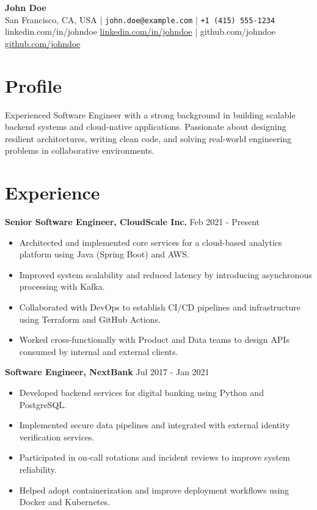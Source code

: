 \documentclass[11pt,a4paper]{article}
\begin{document}
\begin{center}
    {\LARGE \textbf{John Doe}}\\
    \vspace{0.5em}
    San Francisco, CA, USA \quad| \quad \texttt{john.doe@example.com} \quad| \quad \texttt{+1 (415) 555-1234} \\
    \if\relax{}\relax
        linkedin.com/in/johndoe
    \else
        \href{https://linkedin.com/in/johndoe}{linkedin.com/in/johndoe}
    \fi
    \quad| \quad
    \if\relax{}\relax
        github.com/johndoe
    \else
        \href{https://github.com/johndoe}{github.com/johndoe}
    \fi
\end{center}

\vspace{1em}

\section*{Profile}
Experienced Software Engineer with a strong background in building scalable backend systems and cloud-native applications. Passionate about designing resilient architectures, writing clean code, and solving real-world engineering problems in collaborative environments.

\section*{Experience}
\textbf{Senior Software Engineer, CloudScale Inc.} \hfill Feb 2021 - Present \\
\begin{itemize}[leftmargin=1.5em]
  \item Architected and implemented core services for a cloud-based analytics platform using Java (Spring Boot) and AWS.
  \item Improved system scalability and reduced latency by introducing asynchronous processing with Kafka.
  \item Collaborated with DevOps to establish CI/CD pipelines and infrastructure using Terraform and GitHub Actions.
  \item Worked cross-functionally with Product and Data teams to design APIs consumed by internal and external clients.
\end{itemize}

\textbf{Software Engineer, NextBank} \hfill Jul 2017 - Jan 2021 \\
\begin{itemize}[leftmargin=1.5em]
  \item Developed backend services for digital banking using Python and PostgreSQL.
  \item Implemented secure data pipelines and integrated with external identity verification services.
  \item Participated in on-call rotations and incident reviews to improve system reliability.
  \item Helped adopt containerization and improve deployment workflows using Docker and Kubernetes.
\end{itemize}
\end{document}

